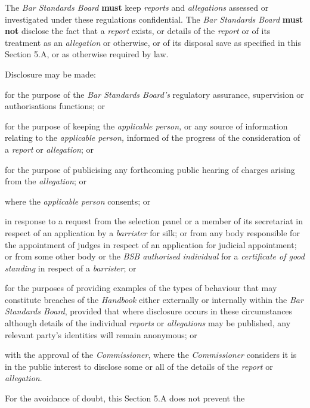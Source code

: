 The \emph{Bar Standards Board}  \textcolor{myred}{\textbf{must}}
keep \emph{reports} and \emph{allegations} assessed or investigated
under these regulations confidential. The \emph{Bar Standards
Board}  \textcolor{myred}{\textbf{must not}} disclose the fact that a \emph{report} exists, or
details of the \emph{report} or of its treatment as
an \emph{allegation} or otherwise, or of its disposal save as specified
in this Section 5.A, or as otherwise required by law.\\
\par
Disclosure may be made:\\\nl \item for the purpose of\emph{ }the \emph{Bar Standards Board's }regulatory
assurance, supervision or authorisations functions; or\item for the purpose of keeping the \emph{applicable person, }or any
source of information relating to the \emph{applicable person, }informed
of the progress of the consideration of
a \emph{report} or \emph{allegation}; or\item for the purpose of publicising any forthcoming public hearing of
charges arising from the \emph{allegation}; or\item where the \emph{applicable} \emph{person }consents; or\item in response to a request from the selection panel or a member of its
secretariat in respect of an application by a \emph{barrister }for silk;
or from any body responsible for the appointment of judges in respect of
an application for judicial appointment; or from some other body or
the \emph{BSB authorised individual }for a \emph{certificate of good
standing }in respect of a \emph{barrister}; or\item for the purposes of providing examples of the types of behaviour that
may constitute breaches of the \emph{Handbook} either externally or
internally within the \emph{Bar Standards Board}, provided that where
disclosure occurs in these circumstances although details of the
individual \emph{reports }or \emph{allegations} may be published, any
relevant party's identities will remain anonymous; or\item with the approval of the \emph{Commissioner}, where
the \emph{Commissioner} considers it is in the public interest to
disclose some or all of the details of
the \emph{report} or \emph{allegation}.\ln
{}\par
{}
For the avoidance of doubt, this Section 5.A does not prevent the
